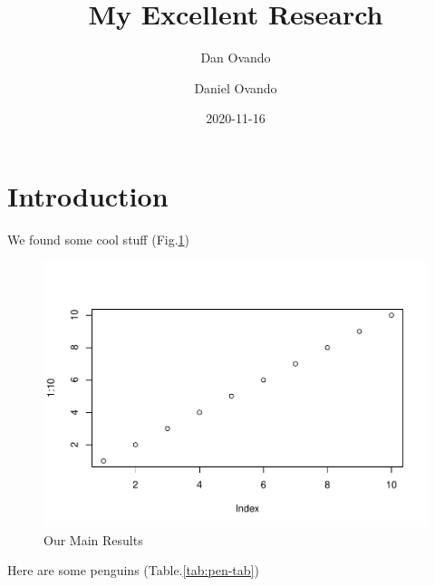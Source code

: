 \documentclass[
]{article}
\title{My Excellent Research}
\author{Dan Ovando \and Daniel Ovando}
\date{2020-11-16}
\begin{document}
\maketitle

{
\hypersetup{linkcolor=}
\setcounter{tocdepth}{2}
\tableofcontents
}
\hypertarget{introduction}{%
\section{Introduction}\label{introduction}}

We found some cool stuff (Fig.\ref{fig:main-fig})

\begin{figure}
\centering
\includegraphics{my-pub_files/figure-latex/main-fig-1.pdf}
\caption{\label{fig:main-fig}Our Main Results}
\end{figure}

Here are some penguins (Table.\ref{tab:pen-tab})
\end{document}
